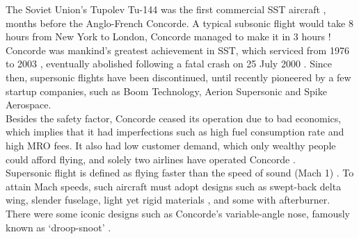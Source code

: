 \documentclass[a4paper,11pt]{article}
\begin{document}
The Soviet Union's Tupolev Tu-144 was the first commercial SST aircraft \cite{fg}, months before the Anglo-French Concorde. A typical subsonic flight would take 8 hours from New York to London, Concorde managed to make it in 3 hours \cite{simpleflying}! Concorde was mankind's greatest achievement in SST, which serviced from 1976 to 2003 \cite{washington}, eventually abolished following a fatal crash on 25 July 2000 \cite{aviationsafety}. Since then, supersonic flights have been discontinued, until recently pioneered by a few startup companies, such as Boom Technology, Aerion Supersonic and Spike Aerospace.\\

Besides the safety factor, Concorde ceased its operation due to bad economics, which implies that it had imperfections such as high fuel consumption rate and high MRO fees. It also had low customer demand, which only wealthy people could afford flying, and solely two airlines have operated Concorde \cite{britannica}.\\

Supersonic flight is defined as flying faster than the speed of sound (Mach 1) \cite{Anderson}. To attain Mach speeds, such aircraft must adopt designs such as swept-back delta wing, slender fuselage, light yet rigid materials \cite{wired}, and some with afterburner. There were some iconic designs such as Concorde's variable-angle nose, famously known as `droop-snoot' \cite{droop}.
\end{document}
